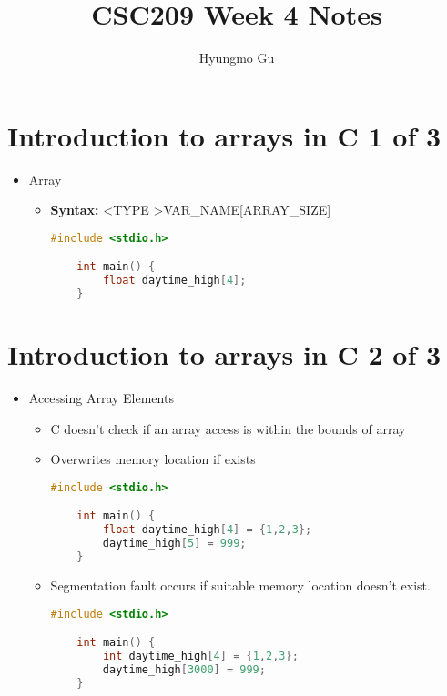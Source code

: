 \documentclass[12pt]{article}
\begin{document}
\title{CSC209 Week 4 Notes}
\author{Hyungmo Gu}
\maketitle

\section*{Introduction to arrays in C 1 of 3}

\bigskip

\begin{itemize}
    \item Array
    \begin{itemize}
    \item \textbf{Syntax:} \textless TYPE \textgreater VAR\_NAME[ARRAY\_SIZE]

    \begin{lstlisting}[language=c]
    #include <stdio.h>

    int main() {
        float daytime_high[4];
    }
    \end{lstlisting}
    \end{itemize}
\end{itemize}

\bigskip

\section*{Introduction to arrays in C 2 of 3}

\bigskip
\begin{itemize}
    \item Accessing Array Elements

    \begin{itemize}
    \item C doesn't check if an array access is within the bounds of array
    \item Overwrites memory location if exists
    \begin{lstlisting}[language=c]
    #include <stdio.h>

    int main() {
        float daytime_high[4] = {1,2,3};
        daytime_high[5] = 999;
    }
    \end{lstlisting}

    \item Segmentation fault occurs if suitable memory location doesn't exist.

    \begin{lstlisting}[language=c]
    #include <stdio.h>

    int main() {
        int daytime_high[4] = {1,2,3};
        daytime_high[3000] = 999;
    }
    \end{lstlisting}
    \end{itemize}
\end{itemize}
\end{document}
